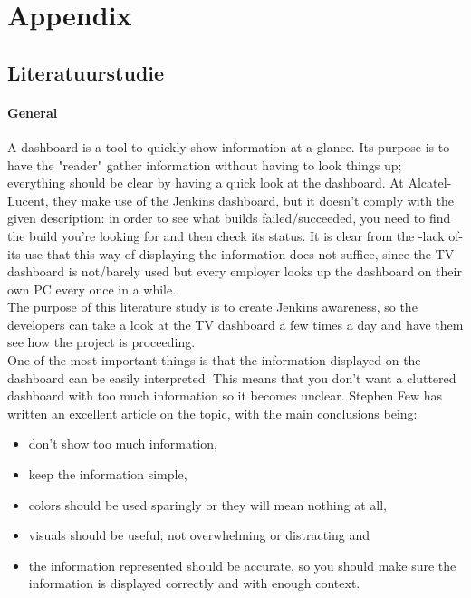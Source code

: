 \documentclass[10pt,a4paper]{article}
\begin{document}
\clearpage

\section{Appendix}
\label{annex}

\begin{appendices}
\section{Literatuurstudie}
\label{lit_study}


\paragraph{General}
A dashboard is a tool to quickly show information at a glance. Its purpose is to have the "reader" gather information without having to look things up; everything should be clear by having a quick look at the dashboard. At Alcatel-Lucent, they make use of the Jenkins dashboard, but it doesn't comply with the given description: in order to see what builds failed/succeeded, you need to find the build you're looking for and then check its status. It is clear from the -lack of- its use that this way of displaying the information does not suffice, since the TV dashboard is not/barely used but every employer looks up the dashboard on their own PC every once in a while. \\

The purpose of this literature study is to create Jenkins awareness, so the developers can take a look at the TV dashboard a few times a day and have them see how the project is proceeding.\\
One of the most important things is that the information displayed on the dashboard can be easily interpreted. This means that you don't want a cluttered dashboard with too much information so it becomes unclear.
Stephen Few has written an excellent article on the topic, with the main conclusions being:
\begin{itemize}
\item don't show too much information,
\item keep the information simple,
\item colors should be used sparingly or they will mean nothing at all,
\item visuals should be useful; not overwhelming or distracting and
\item the information represented should be accurate, so you should make sure the information is displayed correctly and with enough context.
\end{itemize}
 

\end{appendices}
\end{document}
